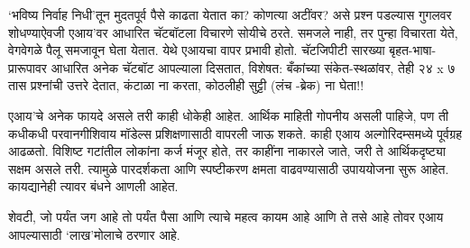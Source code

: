 `भविष्य निर्वाह निधी'तून मुदतपूर्व पैसे काढता येतात का? कोणत्या अटींवर? असे प्रश्न पडल्यास गुगलवर शोधण्याऐवजी एआय'वर आधारित चॅटबॉटला विचारणे सोयीचे ठरते. समजले नाही, तर पुन्हा विचारता येते, वेगवेगळे पैलू समजावून घेता येतात. येथे एआयचा वापर प्रभावी होतो. चॅटजिपीटी सारख्या बृहत-भाषा-प्रारूपावर आधारित अनेक चॅटबॉट आपल्याला दिसतात, विशेषत: बँकांच्या संकेत-स्थळांवर, तेही २४ x ७ तास प्रश्नांची उत्तरे देतात, कंटाळा ना करता, कोठलीही सुट्टी (लंच -ब्रेक) ना घेता!!

एआय'चे अनेक फायदे असले तरी काही धोकेही आहेत. आर्थिक माहिती गोपनीय असली पाहिजे, पण ती कधीकधी परवानगीशिवाय मॉडेल्स प्रशिक्षणासाठी वापरली जाऊ शकते. काही एआय अल्गोरिदम्समध्ये पूर्वग्रह आढळतो. विशिष्ट गटांतील लोकांना कर्ज मंजूर होते, तर काहींना नाकारले जाते, जरी ते आर्थिकदृष्ट्या सक्षम असले तरी. त्यामुळे पारदर्शकता आणि स्पष्टीकरण क्षमता वाढवण्यासाठी उपाययोजना सुरू आहेत. कायद्यानेही त्यावर बंधने आणली आहेत.

शेवटी, जो पर्यंत जग आहे तो पर्यंत पैसा आणि त्याचे महत्व कायम आहे आणि ते तसे आहे तोवर एआय आपल्यासाठी `लाख'मोलाचे ठरणार आहे.